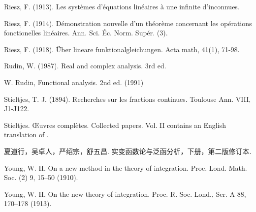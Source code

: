 \documentclass[12pt,b5paper,notitlepage]{article}
\theoremstyle{definition}
\theoremstyle{plain}
\numberwithin{equation}{section}
\begin{document}
\begin{thebibliography}{999999}
Riesz, F. (1913). Les syst\`emes d'\'equations lin\'eaires \`a une infinite d'inconnues.


Riesz, F. (1914). D{\'e}monstration nouvelle d'un th{\'e}or{\`e}me concernant les op{\'e}rations fonctionelles lin{\'e}aires. Ann. Sci. {\'E}c. Norm. Sup{\'e}r. (3).

Riesz, F. (1918). \"Uber lineare funktionalgleichungen. Acta math, 41(1), 71-98.

Rudin, W. (1987). Real and complex analysis. 3rd ed.

W. Rudin, Functional analysis. 2nd ed. (1991)


Stieltjes, T. J. (1894). Recherches sur les fractions continues. Toulouse Ann. VIII, J1-J122.

Stieltjes. {\OE}uvres compl{\`e}tes. {Collected} papers. Vol. II contains an English translation of \cite{Sti94}.


\begin{CJK*}{UTF8}{gkai}
夏道行，吴卓人，严绍宗，舒五昌. 实变函数论与泛函分析，下册，第二版修订本.
\end{CJK*}


Young, W. H. On a new method in the theory of integration. Proc. Lond. Math. Soc. (2) 9, 15--50 (1910).

Young, W. H. On the new theory of integration.  Proc. R. Soc. Lond., Ser. A 88, 170--178 (1913).


		
\end{thebibliography}


\end{document}
